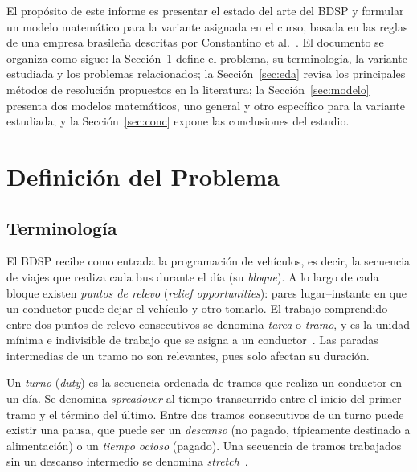 \documentclass[letter, 10pt]{article}
\begin{document}
El propósito de este informe es presentar el estado del arte del BDSP y formular un modelo matemático para la variante asignada en el curso, basada en las reglas de una empresa brasileña descritas por Constantino et al.~\cite{Constantino2017}. El documento se organiza como sigue: la Sección~\ref{sec:def} define el problema, su terminología, la variante estudiada y los problemas relacionados; la Sección~\ref{sec:eda} revisa los principales métodos de resolución propuestos en la literatura; la Sección~\ref{sec:modelo} presenta dos modelos matemáticos, uno general y otro específico para la variante estudiada; y la Sección~\ref{sec:conc} expone las conclusiones del estudio.

\section{Definici\'on del Problema}\label{sec:def}

\subsection{Terminología}
El BDSP recibe como entrada la programación de vehículos, es decir, la secuencia de viajes que realiza cada bus durante el día (su \emph{bloque}). A lo largo de cada bloque existen \emph{puntos de relevo} (\emph{relief opportunities}): pares lugar--instante en que un conductor puede dejar el vehículo y otro tomarlo. El trabajo comprendido entre dos puntos de relevo consecutivos se denomina \emph{tarea} o \emph{tramo}, y es la unidad mínima e indivisible de trabajo que se asigna a un conductor~\cite{Constantino2017}. Las paradas intermedias de un tramo no son relevantes, pues solo afectan su duración.

Un \emph{turno} (\emph{duty}) es la secuencia ordenada de tramos que realiza un conductor en un día. Se denomina \emph{spreadover} al tiempo transcurrido entre el inicio del primer tramo y el término del último. Entre dos tramos consecutivos de un turno puede existir una pausa, que puede ser un \emph{descanso} (no pagado, típicamente destinado a alimentación) o un \emph{tiempo ocioso} (pagado). Una secuencia de tramos trabajados sin un descanso intermedio se denomina \emph{stretch}~\cite{Constantino2017,DeLeone2011a}.
\end{document}
